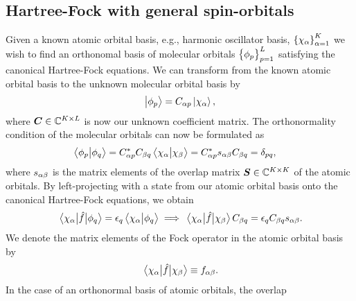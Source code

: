         \subsection{Hartree-Fock with general spin-orbitals}
            \label{subsec:ghf}
            Given a known atomic orbital basis, e.g., harmonic oscillator basis,
            $\left\{ \chi_{\alpha} \right\}_{\alpha = 1}^{K}$ we wish to find an
            orthonomal basis of molecular orbitals $\left\{ \phi_{p} \right\}_{p = 1}^{L}$
            satisfying the canonical Hartree-Fock equations.
            We can transform from the known atomic orbital basis to the unknown
            molecular orbital basis by
            \begin{align}
                \ket{\phi_p} = C_{\alpha p}\ket{\chi_{\alpha}},
            \end{align}
            where $\boldsymbol{C} \in \mathbb{C}^{K\times L}$ is now our unknown
            coefficient matrix.
            The orthonormality condition of the molecular orbitals can now be
            formulated as
            \begin{align}
                \braket{\phi_p}{\phi_q}
                &= C^{*}_{\alpha p} C_{\beta q}
                \braket{\chi_{\alpha}}{\chi_{\beta}}
                = C^{*}_{\alpha p} s_{\alpha \beta}
                C_{\beta q}
                = \delta_{pq},
            \end{align}
            where $s_{\alpha\beta}$ is the matrix elements of the
            overlap matrix $\boldsymbol{S} \in \mathbb{C}^{K\times K}$ of the
            atomic orbitals.
            By left-projecting with a state from our atomic orbital basis onto
            the canonical Hartree-Fock equations, we obtain
            \begin{gather}
                \mel{\chi_{\alpha}}{\hat{f}}{\phi_q}
                = \epsilon_{q} \braket{\chi_{\alpha}}{\phi_q}
                \implies
                \mel{\chi_{\alpha}}{\hat{f}}{\chi_{\beta}} C_{\beta q}
                = \epsilon_q C_{\beta q} s_{\alpha \beta}.
            \end{gather}
            We denote the matrix elements of the Fock operator in the atomic
            orbital basis by
            \begin{align}
                \mel{\chi_{\alpha}}{\hat{f}}{\chi_{\beta}}
                \equiv f_{\alpha \beta}.
                \label{eq:ghf-fock-mel}
            \end{align}
            In the case of an orthonormal basis of atomic orbitals, the overlap
